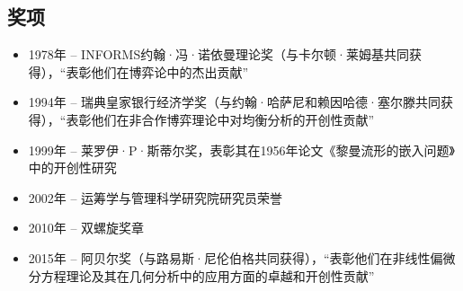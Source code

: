 \subsection{奖项}  
\begin{itemize}
\item 1978年 – INFORMS约翰·冯·诺依曼理论奖（与卡尔顿·莱姆基共同获得），“表彰他们在博弈论中的杰出贡献”  
\item 1994年 – 瑞典皇家银行经济学奖（与约翰·哈萨尼和赖因哈德·塞尔滕共同获得），“表彰他们在非合作博弈理论中对均衡分析的开创性贡献”  
\item 1999年 – 莱罗伊·P·斯蒂尔奖，表彰其在1956年论文《黎曼流形的嵌入问题》中的开创性研究  
\item 2002年 – 运筹学与管理科学研究院研究员荣誉  
\item 2010年 – 双螺旋奖章  
\item 2015年 – 阿贝尔奖（与路易斯·尼伦伯格共同获得），“表彰他们在非线性偏微分方程理论及其在几何分析中的应用方面的卓越和开创性贡献”
\end{itemize}